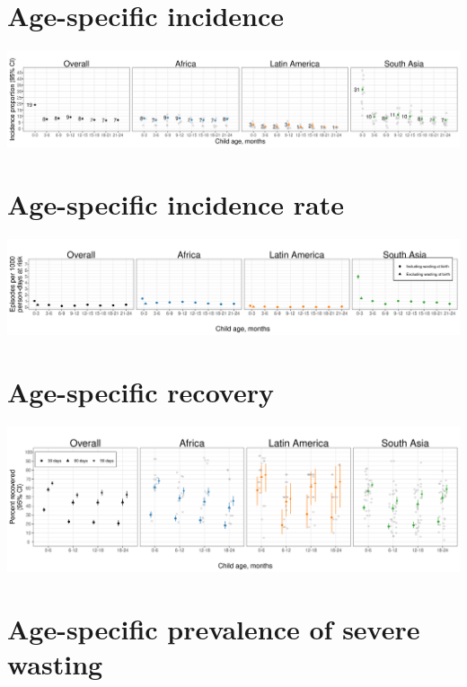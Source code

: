 \documentclass[
  9pt,
]{book}
\begin{document}
\hypertarget{age-specific-incidence-1}{%
\section{Age-specific incidence}\label{age-specific-incidence-1}}

\includegraphics[width=58.33in]{figures//wasting/no-kenaba-bw/fig-wast-ci-no-Kenaba-BW}

\hypertarget{age-specific-incidence-rate-1}{%
\section{Age-specific incidence rate}\label{age-specific-incidence-rate-1}}

\includegraphics[width=58.33in]{figures//wasting/no-kenaba-bw/fig-wast-ir-no-Kenaba-BW}

\hypertarget{age-specific-recovery-1}{%
\section{Age-specific recovery}\label{age-specific-recovery-1}}

\includegraphics[width=58.33in]{figures//wasting/no-kenaba-bw/fig-wast-rec-no-Kenaba-BW}

\hypertarget{age-specific-prevalence-of-severe-wasting-2}{%
\section{Age-specific prevalence of severe wasting}\label{age-specific-prevalence-of-severe-wasting-2}}
\end{document}
